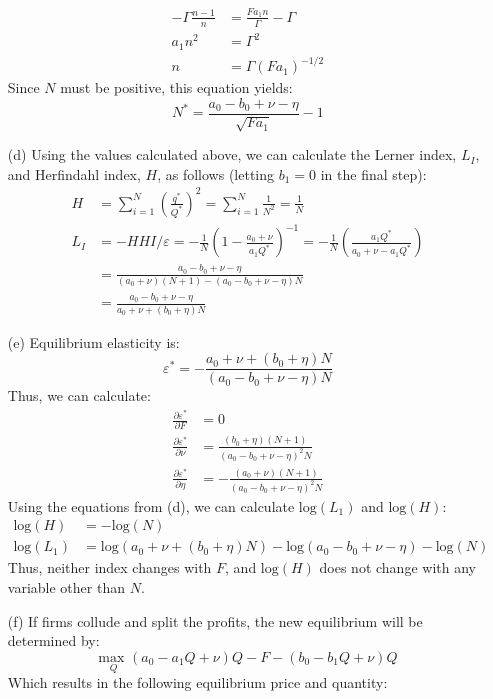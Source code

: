 \documentclass{article}
\newcommand{\loge}[1]{\text{log}\left(#1\right)}
\newcommand{\usmax}[1]{\underset{#1}{\text{max }}}
\newcommand{\pl}{\partial}
\begin{document}
\begin{itemize}
\begin{align*}
      -\Gamma\frac{n-1}{n} &= \frac{Fa_1n}{\Gamma} - \Gamma   \\
      a_1n^2 &= \Gamma^2                                      \\
      n &= \Gamma (Fa_1)^{-1/2}
    \end{align*}
    Since $N$ must be positive, this equation yields: \[
      N^* = \frac{a_0 - b_0 + \nu - \eta}{\sqrt{Fa_1}} - 1
    \]
    \item[(d)] Using the values calculated above, we can calculate the Lerner index, $L_I$, and Herfindahl index, $H$, as follows (letting ${b_1=0}$ in the final step): \begin{align*} 
      H &= \sum_{i=1}^N\left(\frac{q^*}{Q^*}\right)^2 = \sum_{i=1}^N\frac{1}{N^2} = \frac{1}{N} \\
      L_I &=  -HHI/\varepsilon = -\frac{1}{N}\left(1 - \frac{a_0 + \nu}{a_1Q^*}\right)^{-1} =  -\frac{1}{N}\left(\frac{a_1Q^*}{a_0 + \nu - a_1Q^*}\right) \\ &= \frac{a_0-b_0+\nu-\eta}{(a_0 + \nu)(N+1) - \left(a_0-b_0+\nu-\eta\right)N} \\
      &= \frac{a_0-b_0+\nu-\eta}{a_0 + \nu + (b_0 + \eta)N}
    \end{align*} 
    \item[(e)] Equilibrium elasticity is:\[
      \varepsilon^* = -\frac{a_0 + \nu + (b_0 + \eta)N}{(a_0-b_0+\nu-\eta)N}
    \]
    Thus, we can calculate: \begin{align*}
      \frac{\pl\varepsilon^*}{\pl F}    &= 0                                                \\
      \frac{\pl\varepsilon^*}{\pl \nu}  &= \frac{(b_0+\eta)(N+1)}{(a_0-b_0+\nu-\eta)^2N}   \\
      \frac{\pl\varepsilon^*}{\pl \eta} &= -\frac{(a_0+\nu)(N+1)}{(a_0-b_0+\nu-\eta)^2N}  
    \end{align*}
    Using the equations from (d), we can calculate $\loge{L_1}$ and $\loge{H}$:\begin{align*}
      \loge{H}    &= -\loge{N}  \\
      \loge{L_1}  &= \loge{a_0 + \nu + (b_0 + \eta)N} - \loge{a_0-b_0+\nu-\eta} - \loge{N}
    \end{align*}
    Thus, neither index changes with $F$, and $\loge{H}$ does not change with any variable other than $N$.
    \item[(f)] If firms collude and split the profits, the new equilibrium will be determined by: \[
      \usmax{Q}(a_0-a_1Q+\nu)Q - F - (b_0-b_1Q + \nu)Q
    \]
    Which results in the following equilibrium price and quantity:\[
\]
\end{itemize}
\end{document}
